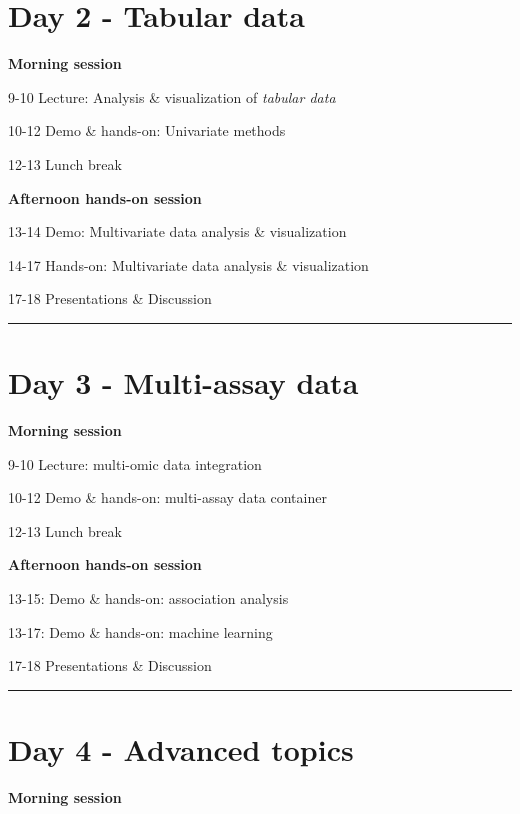 \documentclass[
  oneside]{book}
\begin{document}
\hypertarget{day-2---tabular-data}{%
\section{Day 2 - Tabular data}\label{day-2---tabular-data}}

\textbf{Morning session}

9-10 Lecture: Analysis \& visualization of \emph{tabular data}

10-12 Demo \& hands-on: Univariate methods

12-13 Lunch break

\textbf{Afternoon hands-on session}

13-14 Demo: Multivariate data analysis \& visualization

14-17 Hands-on: Multivariate data analysis \& visualization

17-18 Presentations \& Discussion

\begin{center}\rule{0.5\linewidth}{0.5pt}\end{center}

\hypertarget{day-3---multi-assay-data}{%
\section{Day 3 - Multi-assay data}\label{day-3---multi-assay-data}}

\textbf{Morning session}

9-10 Lecture: multi-omic data integration

10-12 Demo \& hands-on: multi-assay data container

12-13 Lunch break

\textbf{Afternoon hands-on session}

13-15: Demo \& hands-on: association analysis

13-17: Demo \& hands-on: machine learning

17-18 Presentations \& Discussion

\begin{center}\rule{0.5\linewidth}{0.5pt}\end{center}

\hypertarget{day-4---advanced-topics}{%
\section{Day 4 - Advanced topics}\label{day-4---advanced-topics}}

\textbf{Morning session}
\end{document}
